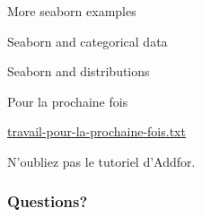 \begin{frame}{More seaborn examples}

\end{frame}

\begin{frame}{Seaborn and categorical data}

\end{frame}

\begin{frame}{Seaborn and distributions}
\end{frame}

\begin{frame}{Pour la prochaine fois}

  \vspace{1cm}
  \centerline{\url{travail-pour-la-prochaine-fois.txt}}

  \vspace{1cm}
  \centerline{N'oubliez pas le tutoriel d'Addfor.}
\end{frame}


\begin{frame}
  \frametitle{Questions?}
\end{frame}


